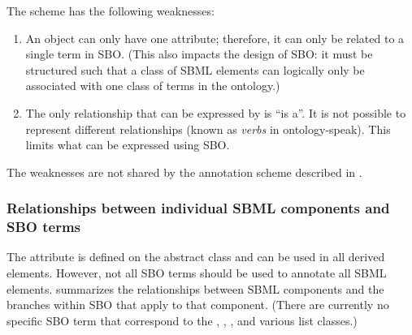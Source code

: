 The scheme has the following weaknesses:
\begin{enumerate}

\item An object can only have one  attribute;
  therefore, it can only be related to a single term in SBO.
  (This also impacts the design of SBO: it must be structured such
  that a class of SBML elements can logically only be associated
  with one class of terms in the ontology.)

\item The only relationship that can be expressed by
   is ``is a''.  It is not possible to represent
  different relationships (known as \emph{verbs} in
  ontology-speak).  This limits what can be expressed using SBO.

\end{enumerate}



The weaknesses are not shared by the annotation scheme described
in .  


\subsubsection{Relationships between individual SBML components and SBO terms}

The  attribute is defined on the abstract class
\SBase and can be used in all derived elements.  However, not all
SBO terms should be used to annotate all SBML elements.
 summarizes the relationships
between SBML components and the branches within SBO that apply to
that component. (There are currently no specific SBO term that
correspond to the \SBML, \UnitDefinition, \Unit, and various
 list classes.)

